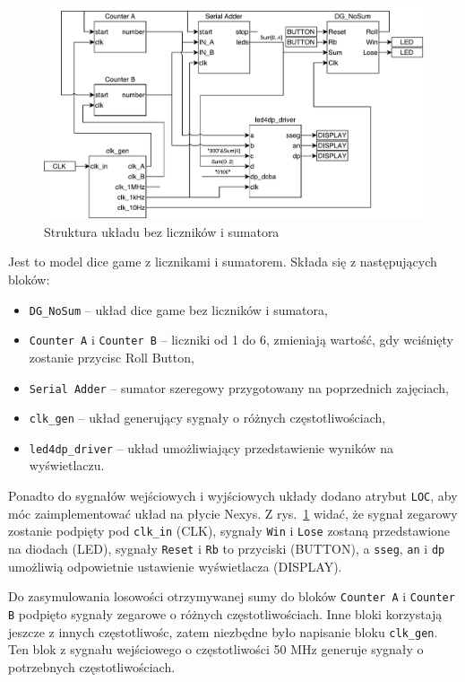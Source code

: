 \documentclass[a4paper,11pt,fleqn]{article}
\begin{document}
\begin{figure}[h]
\centering
\includegraphics[width=\textwidth]{schematics/diceGameAll.pdf}
\caption{Struktura układu bez liczników i sumatora}
\label{diceGameAll}
\end{figure}

Jest to model dice game z licznikami i sumatorem. Składa się z następujących bloków:
\begin{itemize}
\item \texttt{DG\_NoSum} -- układ dice game bez liczników i sumatora,
\item \texttt{Counter A} i \texttt{Counter B} -- liczniki od 1 do 6, zmieniają wartość, gdy wciśnięty zostanie przycisc Roll Button,
\item \texttt{Serial Adder} -- sumator szeregowy przygotowany na poprzednich zajęciach,
\item \texttt{clk\_gen} -- układ generujący sygnały o różnych częstotliwościach,
\item \texttt{led4dp\_driver} -- układ umożliwiający przedstawienie wyników na wyświetlaczu.
\end{itemize}

Ponadto do sygnałów wejściowych i wyjściowych układy dodano atrybut \texttt{LOC}, aby móc zaimplementować układ na płycie Nexys. Z rys.~\ref{diceGameAll} widać, że sygnał zegarowy zostanie podpięty pod \texttt{clk\_in} (CLK), sygnały \texttt{Win} i \texttt{Lose} zostaną przedstawione na diodach (LED), sygnały \texttt{Reset} i \texttt{Rb} to przyciski (BUTTON), a \texttt{sseg}, \texttt{an} i \texttt{dp} umożliwią odpowietnie ustawienie wyświetlacza (DISPLAY).


Do zasymulowania losowości otrzymywanej sumy do bloków \texttt{Counter A} i \texttt{Counter B} podpięto sygnały zegarowe o różnych częstotliwościach. Inne bloki korzystają jeszcze z innych częstotliwośc, zatem niezbędne było napisanie bloku \texttt{clk\_gen}. Ten blok z sygnału wejściowego o częstotliwości 50 MHz generuje sygnały o potrzebnych częstotliwościach.
\end{document}
